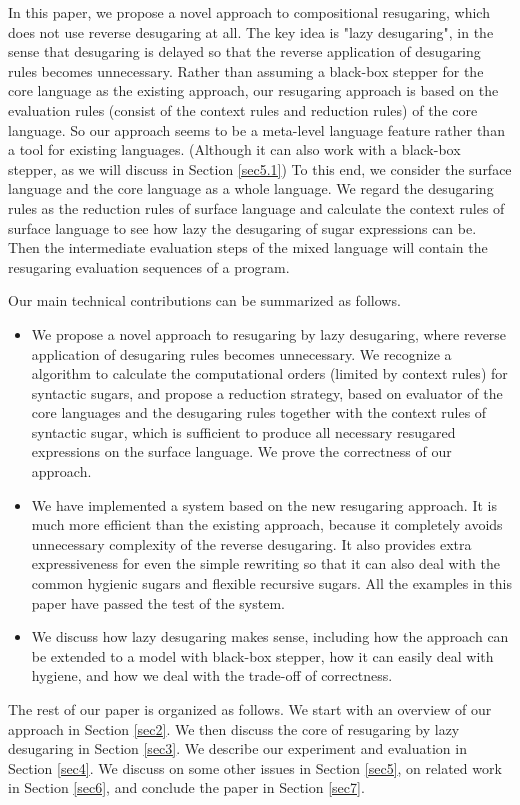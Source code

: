 \label{mark:mention}
In this paper, we propose a novel approach to compositional resugaring, which does not use reverse desugaring at all.
The key idea is "lazy desugaring", in the sense that desugaring is delayed so that the reverse application of desugaring rules becomes unnecessary. Rather than assuming a black-box stepper for the core language as the existing approach, our resugaring approach is based on the evaluation rules (consist of the context rules and reduction rules) of the core language. So our approach seems to be a meta-level language feature rather than a tool for existing languages. (Although it can also work with a black-box stepper, as we will discuss in Section \ref{sec5.1})
To this end, we consider the surface language and the core language as a whole language. We regard the desugaring rules as the reduction rules of surface language and calculate the context rules of surface language to see how lazy the desugaring of sugar expressions can be. Then the intermediate evaluation steps of the mixed language will contain the resugaring evaluation sequences of a program.


Our main technical contributions can be summarized as follows.
\begin{itemize}
\item We propose a novel approach to resugaring by lazy desugaring, where reverse application of desugaring rules becomes unnecessary. We recognize a algorithm to calculate the computational orders (limited by context rules) for syntactic sugars, and propose a reduction strategy, based on evaluator of the core languages and the desugaring rules together with the context rules of syntactic sugar, which is sufficient to produce all necessary resugared expressions on the surface language. We prove the correctness of our approach.

\item We have implemented a system based on the new resugaring approach. It is much more efficient than the existing approach, because it completely avoids unnecessary complexity of the reverse desugaring. It also provides extra expressiveness for even the simple rewriting so that it can also deal with the common hygienic sugars and flexible recursive sugars. All the examples in this paper have passed the test of the system. 

\item We discuss how lazy desugaring makes sense, including how the approach can be extended to a model with black-box stepper, how it can easily deal with hygiene, and how we deal with the trade-off of correctness.


\end{itemize}

The rest of our paper is organized as follows. We start with an overview of our approach in Section \ref{sec2}. We then discuss the core of resugaring by lazy desugaring in Section \ref{sec3}. We describe our experiment and evaluation in Section \ref{sec4}. We discuss on some other issues in Section \ref{sec5}, on related work in Section \ref{sec6}, and conclude the paper in Section \ref{sec7}.
